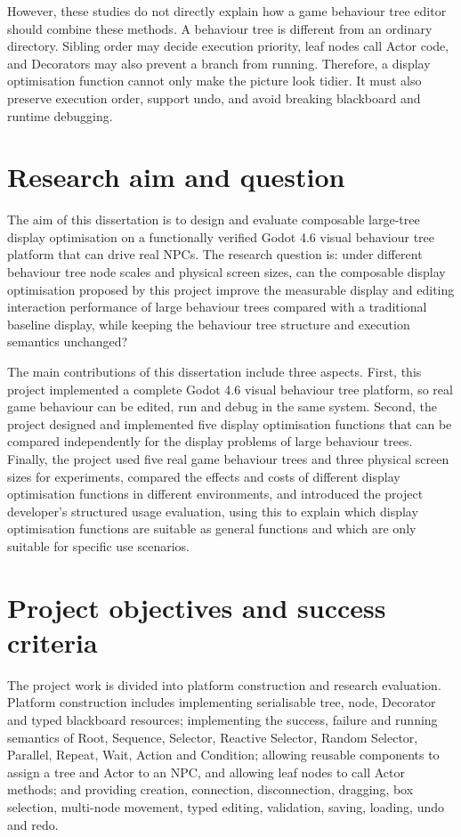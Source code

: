 However, these studies do not directly explain how a game behaviour tree editor should combine these methods. A behaviour tree is different from an ordinary directory. Sibling order may decide execution priority, leaf nodes call Actor code, and Decorators may also prevent a branch from running. Therefore, a display optimisation function cannot only make the picture look tidier. It must also preserve execution order, support undo, and avoid breaking blackboard and runtime debugging.

\section{Research aim and question}

The aim of this dissertation is to design and evaluate composable large-tree display optimisation on a functionally verified Godot 4.6 visual behaviour tree platform that can drive real NPCs. The research question is: under different behaviour tree node scales and physical screen sizes, can the composable display optimisation proposed by this project improve the measurable display and editing interaction performance of large behaviour trees compared with a traditional baseline display, while keeping the behaviour tree structure and execution semantics unchanged?

The main contributions of this dissertation include three aspects. First, this project implemented a complete Godot 4.6 visual behaviour tree platform, so real game behaviour can be edited, run and debug in the same system. Second, the project designed and implemented five display optimisation functions that can be compared independently for the display problems of large behaviour trees. Finally, the project used five real game behaviour trees and three physical screen sizes for experiments, compared the effects and costs of different display optimisation functions in different environments, and introduced the project developer's structured usage evaluation, using this to explain which display optimisation functions are suitable as general functions and which are only suitable for specific use scenarios.

\section{Project objectives and success criteria}

The project work is divided into platform construction and research evaluation. Platform construction includes implementing serialisable tree, node, Decorator and typed blackboard resources; implementing the success, failure and running semantics of Root, Sequence, Selector, Reactive Selector, Random Selector, Parallel, Repeat, Wait, Action and Condition; allowing reusable components to assign a tree and Actor to an NPC, and allowing leaf nodes to call Actor methods; and providing creation, connection, disconnection, dragging, box selection, multi-node movement, typed editing, validation, saving, loading, undo and redo.

